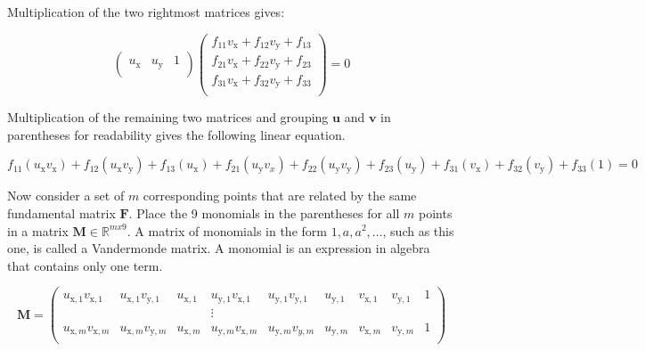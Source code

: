 Multiplication of the two rightmost matrices gives:

\begin{equation}
\begin{pmatrix}
u_\mathrm{x} & u_\mathrm{y} & 1 \\
\end{pmatrix}
\begin{pmatrix}
f_{11} v_\mathrm{x} + f_{12} v_\mathrm{y} + f_{13} \\
f_{21} v_\mathrm{x} + f_{22} v_\mathrm{y} + f_{23} \\
f_{31} v_\mathrm{x} + f_{32} v_\mathrm{y} + f_{33} \\
\end{pmatrix}
= 0
\end{equation}

Multiplication of the remaining two matrices and grouping $\textbf{u}$ and $\textbf{v}$ in parentheses for readability gives the following linear equation.

\begin{equation}
f_{11} (u_\mathrm{x} v_\mathrm{x}) + f_{12} (u_\mathrm{x} v_\mathrm{y}) + f_{13} (u_\mathrm{x}) +
f_{21} (u_\mathrm{y} v_x) + f_{22} (u_\mathrm{y} v_\mathrm{y}) + f_{23} (u_\mathrm{y}) +
f_{31} (v_\mathrm{x}) + f_{32} (v_\mathrm{y}) + f_{33} (1)
= 0
\end{equation}

Now consider a set of $m$ corresponding points that are related by the same fundamental matrix $\textbf{F}$. Place the 9 monomials in the parentheses for all $m$ points in a matrix $\textbf{M} \in \mathbb{R}^{mx9} $. A matrix of monomials in the form $1, a, a^2, \dots$, such as this one, is called a Vandermonde matrix. A monomial is an expression in algebra that contains only one term.

\begin{equation}
\mathbf{M}=
\begin{pmatrix}
u_{\mathrm{x},1} v_{\mathrm{x},1} & u_{\mathrm{x},1} v_{\mathrm{y},1} & u_{\mathrm{x},1} & u_{\mathrm{y},1} v_{\mathrm{x},1} & u_{\mathrm{y},1} v_{\mathrm{y},1} & u_{\mathrm{y},1} & v_{\mathrm{x},1} & v_{\mathrm{y},1} & 1 \\
 & & & \vdots & & & & & \\
u_{\mathrm{x},m} v_{\mathrm{x},m} & u_{\mathrm{x},m} v_{\mathrm{y},m} & u_{\mathrm{x},m} & u_{\mathrm{y},m} v_{\mathrm{x},m} & u_{\mathrm{y},m} v_{y,m} & u_{\mathrm{y},m} & v_{\mathrm{x},m} & v_{\mathrm{y},m} & 1 \\
\end{pmatrix}
\end{equation}

